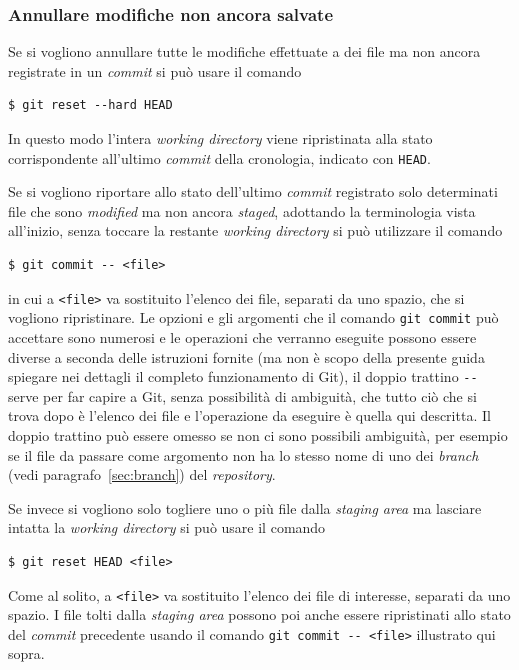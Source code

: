 \documentclass[a4paper,12pt,oneside]{article}
\begin{document}
\subsubsection{Annullare modifiche non ancora salvate}
\label{sec:annullare-modifiche-non-salvate}

Se si vogliono annullare tutte le modifiche effettuate a dei file ma non ancora
registrate in un \emph{commit} si può usare il comando
\begin{lstlisting}
$ git reset --hard HEAD
\end{lstlisting}
In questo modo l'intera \emph{working directory} viene ripristinata alla stato
corrispondente all'ultimo \emph{commit} della cronologia, indicato con
\lstinline|HEAD|.

Se si vogliono riportare allo stato dell'ultimo \emph{commit} registrato solo
determinati file che sono \emph{modified} ma non ancora \emph{staged}, adottando
la terminologia vista all'inizio, senza toccare la restante
\emph{working directory} si può utilizzare il comando
\begin{lstlisting}
$ git commit -- <file>
\end{lstlisting}
in cui a \lstinline|<file>| va sostituito l'elenco dei file, separati da uno
spazio, che si vogliono ripristinare. Le opzioni e gli argomenti che il comando
\lstinline|git commit| può accettare sono numerosi e le operazioni che verranno
eseguite possono essere diverse a seconda delle istruzioni fornite (ma non è
scopo della presente guida spiegare nei dettagli il completo funzionamento di
Git), il doppio trattino \lstinline|--| serve per far capire a Git, senza
possibilità di ambiguità, che tutto ciò che si trova dopo è l'elenco dei file e
l'operazione da eseguire è quella qui descritta. Il doppio trattino può essere
omesso se non ci sono possibili ambiguità, per esempio se il file da passare
come argomento non ha lo stesso nome di uno dei \emph{branch} (vedi
paragrafo~\ref{sec:branch}) del \emph{repository}.

Se invece si vogliono solo togliere uno o più file dalla \emph{staging area} ma
lasciare intatta la \emph{working directory} si può usare il comando
\begin{lstlisting}
$ git reset HEAD <file>
\end{lstlisting}
Come al solito, a \lstinline|<file>| va sostituito l'elenco dei file di
interesse, separati da uno spazio. I file tolti dalla \emph{staging area}
possono poi anche essere ripristinati allo stato del \emph{commit} precedente
usando il comando \lstinline|git commit -- <file>| illustrato qui sopra.
\end{document}
